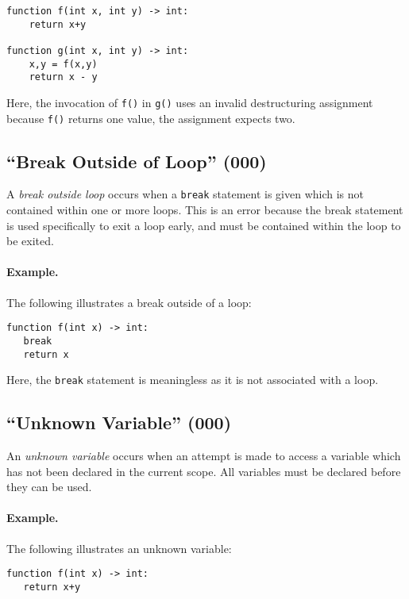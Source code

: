 \begin{lstlisting}
function f(int x, int y) -> int:
    return x+y

function g(int x, int y) -> int:
    x,y = f(x,y)
    return x - y
\end{lstlisting}

Here, the invocation of \lstinline{f()} in \lstinline{g()} uses an invalid destructuring assignment because \lstinline{f()} returns one value, the assignment expects two.

\subsection{``Break Outside of Loop'' (000)}

A {\em break outside loop} occurs when a \lstinline{break} statement is given which is not contained within one or more loops.  This is an error because the break statement is used specifically to exit a loop early, and must be contained within the loop to be exited.  

\paragraph{Example.}  The following illustrates a break outside of a loop:

\begin{lstlisting}
function f(int x) -> int:
   break
   return x
\end{lstlisting}

Here, the \lstinline{break} statement is meaningless as it is not associated with a loop.

\subsection{``Unknown Variable'' (000)}

An {\em unknown variable} occurs when an attempt is made to access a variable which has not been declared in the current scope.  All variables must be declared before they can be used.

\paragraph{Example.}  The following illustrates an unknown variable:

\begin{lstlisting}
function f(int x) -> int:
   return x+y
\end{lstlisting}


